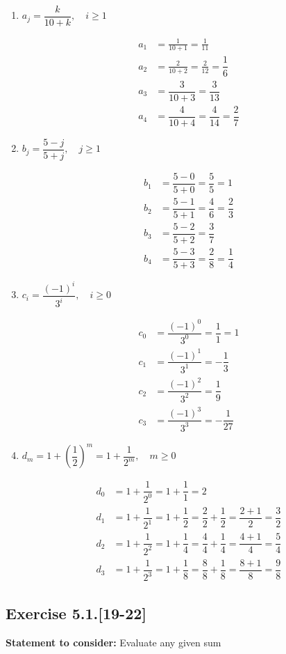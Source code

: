 \documentclass{report}
\newcommand{\mAlign}[1]{\begin{align*}#1\end{align*}}
\newcommand{\assignmentDescription}{\textbf{Statement to consider: }}
\newcommand{\Exercise}[1]{\subsection{Exercise #1}}
\newcommand{\parenthesis}[1]{\left( #1 \right)}
\begin{document}
	\begin{enumerate}
		\item $ a_j = \dfrac{k}{10+k}, \quad i \geq 1$
		
		\mAlign{
			a_1 &= \frac{1}{10+1} = \frac{1}{11} \\
			a_2 &= \frac{2}{10+2} = \frac{2}{12} = \dfrac{1}{6}\\
			a_3 &= \dfrac{3}{10+3} = \dfrac{3}{13} \\
			a_4 &= \dfrac{4}{10+4} = \dfrac{4}{14} = \dfrac{2}{7}
		}
		
		\item $ b_j = \dfrac{5-j}{5+j}, \quad j \geq 1$
		
		\mAlign{b_1 &= \dfrac{5-0}{5+0} = \dfrac{5}{5} = 1\\
					 b_2 &= \dfrac{5-1}{5+1} = \dfrac{4}{6} = \dfrac{2}{3} \\
				 	 b_3 &= \dfrac{5-2}{5+2} = \dfrac{3}{7} \\
			 	 	 b_4 &= \dfrac{5-3}{5+3} = \dfrac{2}{8} = \dfrac{1}{4}}
		
		\item $c_i = \dfrac{(-1)^i}{3^i}, \quad i \geq 0$
		
		\mAlign{c_0 &= \dfrac{(-1)^0}{3^0} = \dfrac{1}{1} = 1 \\
					 c_1 &= \dfrac{(-1)^1}{3^1} = - \dfrac{1}{3} \\
				 	 c_2 &= \dfrac{(-1)^2}{3^2} = \dfrac{1}{9} \\
			 	     c_3 &= \dfrac{(-1)^3}{3^3} = -\dfrac{1}{27}}
		
		\item $d_m = 1 + \parenthesis{\dfrac{1}{2}}^m = 1 + \dfrac{1}{2^m}, \quad m \geq 0$
		
		\mAlign{ d_0 &= 1 + \dfrac{1}{2^0} = 1 + \dfrac{1}{1} = 2 \\
					 d_1 &= 1+ \dfrac{1}{2^1} = 1+ \dfrac{1}{2} = \dfrac{2}{2} + \dfrac{1}{2} = \dfrac{2+1}{2} = \dfrac{3}{2} \\
				 	 d_2 &= 1 + \dfrac{1}{2^2} = 1 + \dfrac{1}{4} = \dfrac{4}{4} + \dfrac{1}{4} = \dfrac{4+1}{4} = \dfrac{5}{4} \\
			 		 d_3 &= 1 + \dfrac{1}{2^3} = 1+\dfrac{1}{8} = \dfrac{8}{8} + \dfrac{1}{8} = \dfrac{8+1}{8}=\dfrac{9}{8}}
		
	\end{enumerate}
	\Exercise{5.1.[19-22]}
	
	\assignmentDescription
	Evaluate any given sum
		
\end{document}
